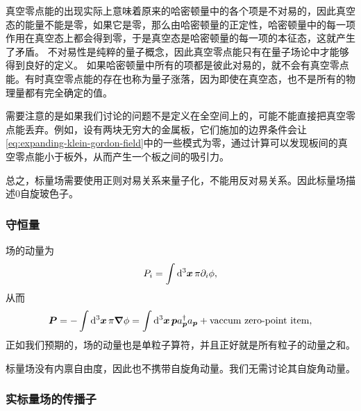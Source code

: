 \documentclass[hyperref, UTF8, a4paper]{ctexart}
\begin{document}
真空零点能的出现实际上意味着原来的哈密顿量中的各个项是不对易的，因此真空态的能量不能是零，如果它是零，那么由哈密顿量的正定性，哈密顿量中的每一项作用在真空态上都会得到零，于是真空态是哈密顿量的每一项的本征态，这就产生了矛盾。
不对易性是纯粹的量子概念，因此真空零点能只有在量子场论中才能够得到良好的定义。
如果哈密顿量中所有的项都是彼此对易的，就不会有真空零点能。有时真空零点能的存在也称为量子涨落，因为即使在真空态，也不是所有的物理量都有完全确定的值。

需要注意的是如果我们讨论的问题不是定义在全空间上的，可能不能直接把真空零点能丢弃。例如，设有两块无穷大的金属板，它们施加的边界条件会让\eqref{eq:expanding-klein-gordon-field}中的一些模式为零，通过计算可以发现板间的真空零点能小于板外，从而产生一个板之间的吸引力。

总之，标量场需要使用正则对易关系来量子化，不能用反对易关系。因此标量场描述$0$自旋玻色子。

\subsubsection{守恒量}

场的动量为
\[
    P_i = \int \dd[3]{\vb*{x}} \pi \partial_i \phi,
\]
从而
\begin{equation}
    {\vb*{P}} = - \int \dd[3]{\vb*{x}} {\pi} \grad{{\phi}} = \int \dd[3]{\vb*{x}} \vb*{p} {a}^\dagger_{\vb*{p}} {a}_{\vb*{p}} + \text{vaccum zero-point item},
\end{equation}
正如我们预期的，场的动量也是单粒子算符，并且正好就是所有粒子的动量之和。

标量场没有内禀自由度，因此也不携带自旋角动量。我们无需讨论其自旋角动量。

\subsubsection{实标量场的传播子}
\end{document}
